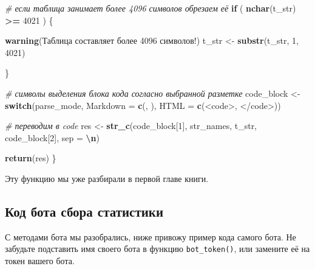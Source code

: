\documentclass[
]{book}
\newenvironment{Shaded}{\begin{snugshade}}{\end{snugshade}}
\newcommand{\AttributeTok}[1]{\textcolor[rgb]{0.13,0.29,0.53}{#1}}
\newcommand{\CommentTok}[1]{\textcolor[rgb]{0.56,0.35,0.01}{\textit{#1}}}
\newcommand{\ControlFlowTok}[1]{\textcolor[rgb]{0.13,0.29,0.53}{\textbf{#1}}}
\newcommand{\DecValTok}[1]{\textcolor[rgb]{0.00,0.00,0.81}{#1}}
\newcommand{\FunctionTok}[1]{\textcolor[rgb]{0.13,0.29,0.53}{\textbf{#1}}}
\newcommand{\NormalTok}[1]{#1}
\newcommand{\OtherTok}[1]{\textcolor[rgb]{0.56,0.35,0.01}{#1}}
\newcommand{\SpecialCharTok}[1]{\textcolor[rgb]{0.81,0.36,0.00}{\textbf{#1}}}
\newcommand{\StringTok}[1]{\textcolor[rgb]{0.31,0.60,0.02}{#1}}
\begin{document}
\begin{Shaded}
\begin{Highlighting}[]
  \CommentTok{\# если таблица занимает более 4096 символов обрезаем её}
  \ControlFlowTok{if}\NormalTok{ ( }\FunctionTok{nchar}\NormalTok{(t\_str) }\SpecialCharTok{\textgreater{}=} \DecValTok{4021}\NormalTok{ ) \{}
    
    \FunctionTok{warning}\NormalTok{(}\StringTok{\textquotesingle{}Таблица составляет более 4096 символов!\textquotesingle{}}\NormalTok{)}
\NormalTok{    t\_str }\OtherTok{\textless{}{-}} \FunctionTok{substr}\NormalTok{(t\_str, }\DecValTok{1}\NormalTok{, }\DecValTok{4021}\NormalTok{)}
    
\NormalTok{  \}}
  
  \CommentTok{\# символы выделения блока кода согласно выбранной разметке}
\NormalTok{  code\_block }\OtherTok{\textless{}{-}} \ControlFlowTok{switch}\NormalTok{(parse\_mode, }
                       \StringTok{\textquotesingle{}Markdown\textquotesingle{}} \OtherTok{=} \FunctionTok{c}\NormalTok{(}\StringTok{\textquotesingle{}\textasciigrave{}\textasciigrave{}\textasciigrave{}\textquotesingle{}}\NormalTok{, }\StringTok{\textquotesingle{}\textasciigrave{}\textasciigrave{}\textasciigrave{}\textquotesingle{}}\NormalTok{),}
                       \StringTok{\textquotesingle{}HTML\textquotesingle{}} \OtherTok{=} \FunctionTok{c}\NormalTok{(}\StringTok{\textquotesingle{}\textless{}code\textgreater{}\textquotesingle{}}\NormalTok{, }\StringTok{\textquotesingle{}\textless{}/code\textgreater{}\textquotesingle{}}\NormalTok{))}
  
  \CommentTok{\# переводим в code}
\NormalTok{  res }\OtherTok{\textless{}{-}} \FunctionTok{str\_c}\NormalTok{(code\_block[}\DecValTok{1}\NormalTok{], str\_names, t\_str, code\_block[}\DecValTok{2}\NormalTok{], }\AttributeTok{sep =} \StringTok{\textquotesingle{}}\SpecialCharTok{\textbackslash{}n}\StringTok{\textquotesingle{}}\NormalTok{)}
  
  \FunctionTok{return}\NormalTok{(res)}
\NormalTok{\}}
\end{Highlighting}
\end{Shaded}

Эту функцию мы уже разбирали в первой главе книги.

\subsection{Код бота сбора статистики}\label{ux43aux43eux434-ux431ux43eux442ux430-ux441ux431ux43eux440ux430-ux441ux442ux430ux442ux438ux441ux442ux438ux43aux438}

С методами бота мы разобрались, ниже привожу пример кода самого бота. Не забудьте подставить имя своего бота в функцию \texttt{bot\_token()}, или замените её на токен вашего бота.
\end{document}
